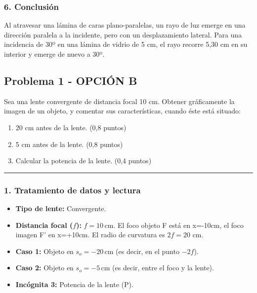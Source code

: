 \subsubsection*{6. Conclusión}
\begin{cajaconclusion}
Al atravesar una lámina de caras plano-paralelas, un rayo de luz emerge en una dirección paralela a la incidente, pero con un desplazamiento lateral. Para una incidencia de 30º en una lámina de vidrio de 5 cm, el rayo recorre 5,30 cm en su interior y emerge de nuevo a 30º.
\end{cajaconclusion}

\newpage

\subsection{Problema 1 - OPCIÓN B}
\label{subsec:3B_2001_jun_ord}

\begin{cajaenunciado}
Sea una lente convergente de distancia focal 10 cm. Obtener gráficamente la imagen de un objeto, y comentar sus características, cuando éste está situado:
\begin{enumerate}
    \item 20 cm antes de la lente. (0,8 puntos)
    \item 5 cm antes de la lente. (0,8 puntos)
    \item Calcular la potencia de la lente. (0,4 puntos)
\end{enumerate}
\end{cajaenunciado}
\hrule

\subsubsection*{1. Tratamiento de datos y lectura}
\begin{itemize}
    \item \textbf{Tipo de lente:} Convergente.
    \item \textbf{Distancia focal ($f$):} $f = 10 \, \text{cm}$. El foco objeto F está en x=-10cm, el foco imagen F' en x=+10cm. El radio de curvatura es $2f=20$ cm.
    \item \textbf{Caso 1:} Objeto en $s_o = -20 \, \text{cm}$ (es decir, en el punto $-2f$).
    \item \textbf{Caso 2:} Objeto en $s_o = -5 \, \text{cm}$ (es decir, entre el foco y la lente).
    \item \textbf{Incógnita 3:} Potencia de la lente (P).
\end{itemize}

